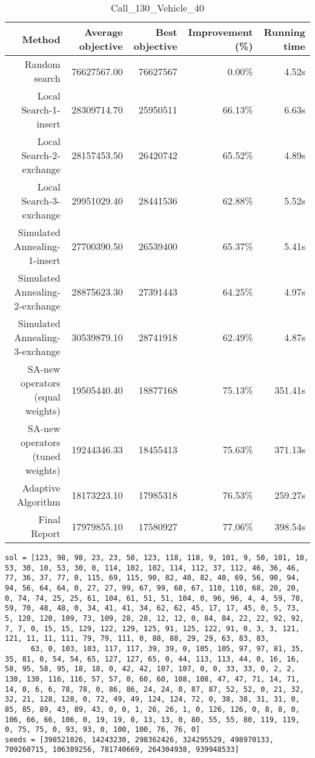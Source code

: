\begin{table}[ht]
\centering
\caption{Call\_130\_Vehicle\_40}
\label{tab:call130vehicle40}
\begin{tabular}{|r|r|r|r|r|}
Method & Average objective & Best objective & Improvement (\%) & Running time \\
\hline
Random search & 76627567.00 & 76627567 & 0.00\% & 4.52s\\
Local Search-1-insert & 28309714.70 & 25950511 & 66.13\% & 6.63s\\
Local Search-2-exchange & 28157453.50 & 26420742 & 65.52\% & 4.89s\\
Local Search-3-exchange & 29951029.40 & 28441536 & 62.88\% & 5.52s\\
Simulated Annealing-1-insert & 27700390.50 & 26539400 & 65.37\% & 5.41s\\
Simulated Annealing-2-exchange & 28875623.30 & 27391443 & 64.25\% & 4.97s\\
Simulated Annealing-3-exchange & 30539879.10 & 28741918 & 62.49\% & 4.87s\\
SA-new operators (equal weights) & 19505440.40 & 18877168 & 75.13\% & 351.41s\\
SA-new operators (tuned weights) & 19244346.33 & 18455413 & 75.63\% & 371.13s\\
Adaptive Algorithm & 18173223.10 & 17985318 & 76.53\% & 259.27s\\
Final Report & 17979855.10 & 17580927 & 77.06\% & 398.54s\\
\end{tabular}%
\end{table}
\begin{lstlisting}[label={lst:call130vehicle40},caption=Optimal solution call\_130\_vehicle\_40]
sol = [123, 98, 98, 23, 23, 50, 123, 118, 118, 9, 101, 9, 50, 101, 10, 53, 30, 10, 53, 30, 0, 114, 102, 102, 114, 112, 37, 112, 46, 36, 46, 77, 36, 37, 77, 0, 115, 69, 115, 90, 82, 40, 82, 40, 69, 56, 90, 94, 94, 56, 64, 64, 0, 27, 27, 99, 67, 99, 68, 67, 110, 110, 68, 20, 20, 0, 74, 74, 25, 25, 61, 104, 61, 51, 51, 104, 0, 96, 96, 4, 4, 59, 70, 59, 70, 48, 48, 0, 34, 41, 41, 34, 62, 62, 45, 17, 17, 45, 0, 5, 73, 5, 120, 120, 109, 73, 109, 28, 28, 12, 12, 0, 84, 84, 22, 22, 92, 92, 7, 7, 0, 15, 15, 129, 122, 129, 125, 91, 125, 122, 91, 0, 3, 3, 121, 121, 11, 11, 111, 79, 79, 111, 0, 88, 88, 29, 29, 63, 83, 83,
      63, 0, 103, 103, 117, 117, 39, 39, 0, 105, 105, 97, 97, 81, 35, 35, 81, 0, 54, 54, 65, 127, 127, 65, 0, 44, 113, 113, 44, 0, 16, 16, 58, 95, 58, 95, 18, 18, 0, 42, 42, 107, 107, 0, 0, 33, 33, 0, 2, 2, 130, 130, 116, 116, 57, 57, 0, 60, 60, 108, 108, 47, 47, 71, 14, 71, 14, 0, 6, 6, 78, 78, 0, 86, 86, 24, 24, 0, 87, 87, 52, 52, 0, 21, 32, 32, 21, 128, 128, 0, 72, 49, 49, 124, 124, 72, 0, 38, 38, 31, 31, 0, 85, 85, 89, 43, 89, 43, 0, 0, 1, 26, 26, 1, 0, 126, 126, 0, 8, 8, 0, 106, 66, 66, 106, 0, 19, 19, 0, 13, 13, 0, 80, 55, 55, 80, 119, 119, 0, 75, 75, 0, 93, 93, 0, 100, 100, 76, 76, 0]
seeds = [398521026, 14243230, 298362426, 324295529, 498970133, 709260715, 106389256, 781740669, 264304938, 939948533]
\end{lstlisting}%
\clearpage


